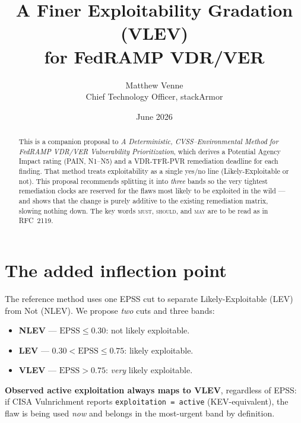 \documentclass[11pt]{article}
\title{\bfseries A Finer Exploitability Gradation (VLEV)\\ for FedRAMP VDR/VER}
\author{Matthew Venne \\ \small Chief Technology Officer, stackArmor}
\date{June 2026}
\newcommand{\code}[1]{\texttt{#1}}
\newcommand{\rfckw}[1]{\textsc{#1}}
\begin{document}
\maketitle

\begin{abstract}
\noindent
This is a companion proposal to \emph{A Deterministic, CVSS--Environmental Method for
FedRAMP VDR/VER Vulnerability Prioritization}, which derives a Potential Agency
Impact rating (PAIN, N1--N5) and a VDR-TFR-PVR remediation deadline for each finding.
That method treats exploitability as a single yes/no line (Likely-Exploitable or
not). This proposal recommends splitting it into \emph{three} bands so the very
tightest remediation clocks are reserved for the flaws most likely to be exploited in
the wild --- and shows that the change is purely additive to the existing remediation
matrix, slowing nothing down. The key words \rfckw{must}, \rfckw{should}, and
\rfckw{may} are to be read as in RFC~2119.
\end{abstract}

\section{The added inflection point}
The reference method uses one EPSS cut to separate Likely-Exploitable (LEV) from Not
(NLEV). We propose \emph{two} cuts and three bands:
\begin{itemize}[leftmargin=1.5em,nosep,topsep=3pt]
\item \textbf{NLEV} --- $\text{EPSS} \le 0.30$: not likely exploitable.
\item \textbf{LEV} --- $0.30 < \text{EPSS} \le 0.75$: likely exploitable.
\item \textbf{VLEV} --- $\text{EPSS} > 0.75$: \emph{very} likely exploitable.
\end{itemize}
\textbf{Observed active exploitation always maps to VLEV}, regardless of EPSS: if CISA
Vulnrichment reports \code{exploitation = active} (KEV-equivalent), the flaw is being
used \emph{now} and belongs in the most-urgent band by definition.
\end{document}
